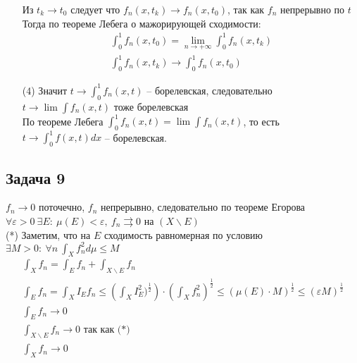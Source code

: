 \begin{enumerate}
		Из $t_k \to t_0$ следует что $f_n(x,t_k) \to f_n(x,t_0)$, так как $f_n$ непрерывно по $t$\\
		Тогда по теореме Лебега о мажорирующей сходимости:
		\begin{gather*}
			\int_{0}^{1} f_n (x,t_0) = \lim\limits_{n \to +\infty} \int_{0}^{1} f_n(x,t_k)\\
			\int_{0}^{1} f_n(x,t_k) \to \int_{0}^{1} f_n(x,t_0)
		\end{gather*}
	\item[(4)]
		Значит $t \to \int_{0}^{1} f_n(x,t)$ -- борелевская, следовательно $t \to \lim \int f_n(x,t)$ тоже борелевская\\
		По теореме Лебега $\int_{0}^{1} f_n(x,t) = \lim \int f_n (x,t)$, то есть $t \to \int_{0}^{1} f(x,t) dx$ -- борелевская.
	\end{enumerate}
	\vskip0.5in


\subsection*{Задача 9}
	$f_n \to 0$ поточечно, $f_n$ непрерывно, следовательно по теореме Егорова $\forall \varepsilon > 0\ \exists E:\ \mu(E) < \varepsilon,\ f_n \rightrightarrows 0$ на $(X \backslash E)$\\
	(*) Заметим, что на $E$ сходимость равномерная по условию $\exists M > 0:\ \forall n\ \int_{X} f_n^{2} d \mu \leqslant M$
	\begin{gather*}
		\int_{X} f_n = \int_{E} f_n + \int_{X \backslash E} f_n\\
		\int_{E} f_n = \int_{X} I_{E} f_n \leqslant \left(\int_{X} I_{E}^{2})^{\frac{1}{2}}\right) \cdot \left(\int_{X} f_n^{2}\right)^{\frac{1}{2}} \leqslant (\mu(E) \cdot M)^{\frac{1}{2}} \leqslant (\varepsilon M)^{\frac{1}{2}}\\
		\int_{E} f_n \to 0\\
		\int_{X \backslash E} f_n \to 0 \text{ так как (*)}\\
		\int_{X} f_n \to 0
	\end{gather*}
	
	

\newpage

